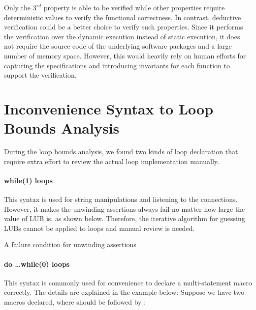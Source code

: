 \noindent 
Only the $3^{rd}$ property is able to be verified while other properties require deterministic values to verify the functional correctness. In contrast, deductive verification could be a better choice to verify such properties. Since it performs the verification over the dynamic execution instead of static execution, it does not require the source code of the underlying software packages and a large number of memory space. However, this would heavily rely on human efforts for capturing the specifications and introducing invariants for each function to support the verification. 

\section{Inconvenience Syntax to Loop Bounds Analysis}
During the loop bounds analysis, we found two kinds of loop declaration that require extra effort to review the actual loop implementation manually. 

\paragraph{while(1) loops} This syntax is used for string manipulations and listening to the connections. However, it makes the unwinding assertions always fail no matter how large the value of LUB is, as shown below. Therefore, the iterative algorithm for guessing LUBs cannot be applied to  loops and manual review is needed.

\begin{listing}
\caption{A failure condition for unwinding assertions}
\end{listing}


\paragraph{do \dots while(0) loops}
This syntax is commonly used for convenience to declare a multi-statement macro correctly. The details are explained in the example below: Suppose we have two macros declared, where  should be followed by :

